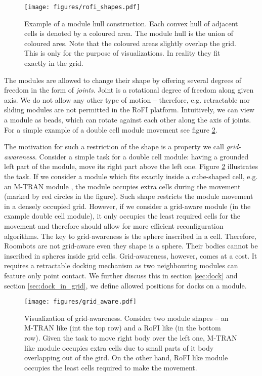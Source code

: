 \begin{figure}[!ht]
    \centering
    \texttt{[image: figures/rofi\_shapes.pdf]}
    \caption{Example of a module hull construction. Each convex hull of adjacent
    cells is denoted by a coloured area. The module hull is the union of coloured
    ares. Note that the coloured areas slightly overlap the grid. This is only
    for the purpose of visualizations. In reality they fit exactly in the grid.}
    \label{fig:rofi_shapes}
\end{figure}

The modules are allowed to change their shape by offering several degrees of
freedom in the form of \emph{joints}. Joint is a rotational degree of freedom
along given axis. We do not allow any other type of motion -- therefore, e.g.
retractable nor sliding modules are not permitted in the RoFI platform.
Intuitively, we can view a module as beads, which can rotate against each other
along the axis of joints. For a simple example of a double cell module movement
see figure \ref{fig:grid_aware}.

The motivation for such a restriction of the shape is a property we call
\emph{grid-awareness}. Consider a simple task for a double cell module: having a
grounded left part of the module, move its right part above the left one. Figure
\ref{fig:grid_aware} illustrates the task. If we consider a module which fits
exactly inside a cube-shaped cell, e.g. an M-TRAN module
\cite{haruhisa_kurokawa_m-tran_2003}, the module occupies extra cells during the
movement (marked by red circles in the figure). Such shape restricts the module
movement in a densely occupied grid. However, if we consider a grid-aware module
(in the example double cell module), it only occupies the least required cells
for the movement and therefore should allow for more efficient reconfiguration
algorithms. The key to grid-awareness is the sphere inscribed in a cell.
Therefore, Roombots\cite{bonardi_locomotion_2012} are not grid-aware even they
shape is a sphere. Their bodies cannot be inscribed in spheres inside grid
cells. Grid-awareness, however, comes at a cost. It requires a retractable
docking mechanism as two neighbouring modules can feature only point contact. We
further discuss this in section \ref{sec:dock} and section
\ref{sec:dock_in_grid}, we define allowed positions for docks on a module.

\begin{figure}[!t]
    \centering
    \texttt{[image: figures/grid\_aware.pdf]}
    \caption{Visualization of grid-awareness. Consider two module shapes -- an
    M-TRAN\cite{haruhisa_kurokawa_m-tran_2003} like (int the top row) and a RoFI
    like (in the bottom row). Given the task to move right body over the left
    one, M-TRAN like module occupies extra cells due to small parts of it body
    overlapping out of the gird. On the other hand, RoFI like module occupies
    the least cells required to make the movement. }
    \label{fig:grid_aware}
\end{figure}

